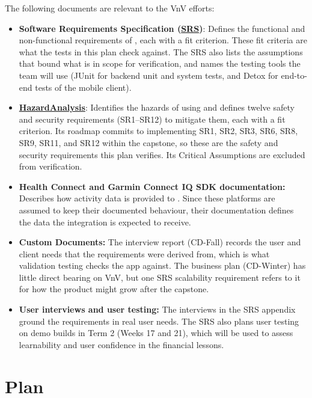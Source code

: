 \documentclass[12pt, titlepage]{article}
\begin{document}
The following documents are relevant to the VnV efforts:
\begin{itemize}
  \item \textbf{Software Requirements Specification (\href{https://github.com/arjunkarthik123/fitness-finance-application/blob/main/pdfs/SRS-Volere/SRS.pdf}{SRS})}: Defines the functional and non-functional requirements of \progname{}, each with a fit criterion. These fit criteria are what the tests in this plan check against. The SRS also lists the assumptions that bound what is in scope for verification, and names the testing tools the team will use (JUnit for backend unit and system tests, and Detox for end-to-end tests of the mobile client).
  \item \textbf{\href{https://github.com/arjunkarthik123/fitness-finance-application/blob/main/pdfs/HazardAnalysis/HazardAnalysis.pdf}{HazardAnalysis}}: Identifies the hazards of using \progname{} and defines twelve safety and security requirements (SR1--SR12) to mitigate them, each with a fit criterion. Its roadmap commits to implementing SR1, SR2, SR3, SR6, SR8, SR9, SR11, and SR12 within the capstone, so these are the safety and security requirements this plan verifies. Its Critical Assumptions are excluded from verification.
  \item \textbf{Health Connect and Garmin Connect IQ SDK documentation:} Describes how activity data is provided to \progname{}. Since these platforms are assumed to keep their documented behaviour, their documentation defines the data the integration is expected to receive.
  \item \textbf{Custom Documents:} The interview report (CD-Fall) records the user and client needs that the requirements were derived from, which is what validation testing checks the app against. The business plan (CD-Winter) has little direct bearing on VnV, but one SRS scalability requirement refers to it for how the product might grow after the capstone.
  \item \textbf{User interviews and user testing:} The interviews in the SRS appendix ground the requirements in real user needs. The SRS also plans user testing on demo builds in Term 2 (Weeks 17 and 21), which will be used to assess learnability and user confidence in the financial lessons.
\end{itemize}

\section{Plan}\label{sec:plan}
\end{document}

